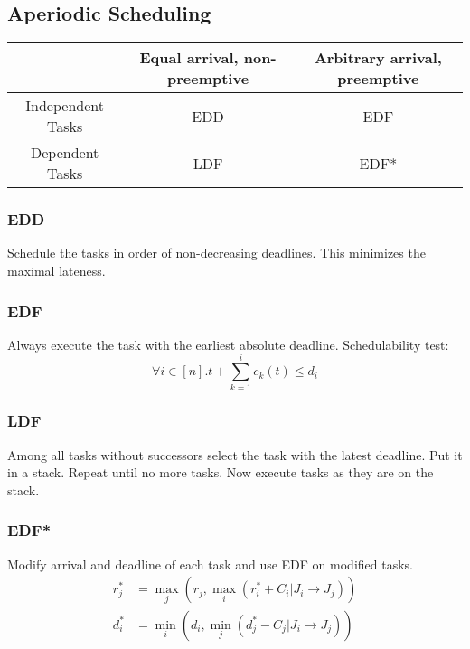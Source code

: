 \documentclass[a4paper,titlepage]{article}
\begin{document}
\subsection{Aperiodic Scheduling}
\begin{center}
	{\renewcommand{\arraystretch}{2}
	\begin{tabular}{|c|c|c|}
		\hline
							& Equal arrival, non-preemptive	& Arbitrary arrival, preemptive \tabularnewline\hline
		Independent Tasks	& EDD							& EDF							\tabularnewline\hline
		Dependent Tasks		& LDF							& EDF*							\tabularnewline\hline
	\end{tabular}}
\end{center}

\subsubsection{EDD}
Schedule the tasks in order of non-decreasing deadlines. This minimizes the
maximal lateness.

\subsubsection{EDF}
Always execute the task with the earliest absolute deadline.
Schedulability test:
\begin{equation*}
	\forall i \in [n] . t + \sum_{k = 1}^{i} c_k(t) \leq d_i
\end{equation*}

\subsubsection{LDF}
Among all tasks without successors select the task with the latest deadline. Put
it in a stack. Repeat until no more tasks. Now execute tasks as they are on the
stack.

\subsubsection{EDF*}
Modify arrival and deadline of each task and use EDF on modified tasks.
\begin{align*}
	r_j^* &= \max_{j}\left(r_j, \max_{i}\left(r_i^* + C_i | J_i \to J_j\right)\right) \\
	d_i^* &= \min_{i}\left(d_i, \min_{j}\left(d_j^* - C_j | J_i \to J_j\right)\right)
\end{align*}
\end{document}

